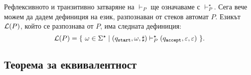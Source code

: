 Рефлексивното и транзитивно затваряне на $\vdash_P$ ще означаваме с $\vdash^\star_P$.
Сега вече можем да дадем дефиниция на език, разпознаван от стеков автомат $P$.
Езикът $\mathcal{L}(P)$, който се разпознава от $P$, има следната дефиниция:
\[\mathcal{L}(P) = \{\ \omega \in \Sigma^\star \mid (q_{\texttt{start}},\omega,\sharp) \vdash^\star_P (q_{\texttt{accept}},\varepsilon,\varepsilon)\ \}.\]



\subsection{Теорема за еквивалентност}

